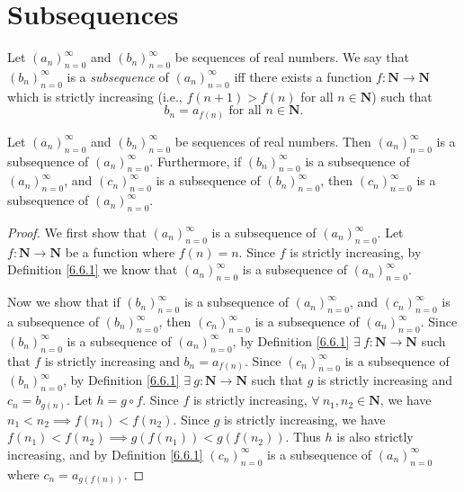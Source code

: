 \section{Subsequences}\label{sec 6.6}

\begin{definition}[Subsequences]\label{6.6.1}
    Let \((a_n)_{n = 0}^\infty\) and \((b_n)_{n = 0}^\infty\) be sequences of real numbers.
    We say that \((b_n)_{n = 0}^\infty\) is a \emph{subsequence} of \((a_n)_{n = 0}^\infty\) iff there exists a function \(f : \mathbf{N} \to \mathbf{N}\) which is strictly increasing (i.e., \(f(n + 1) > f(n)\) for all \(n \in \mathbf{N}\)) such that
    \[
        b_n = a_{f(n)} \text{ for all } n \in \mathbf{N}.
    \]
\end{definition}

\setcounter{theorem}{3}
\begin{lemma}\label{6.6.4}
    Let \((a_n)_{n = 0}^\infty\) and \((b_n)_{n = 0}^\infty\) be sequences of real numbers.
    Then \((a_n)_{n = 0}^\infty\) is a subsequence of \((a_n)_{n = 0}^\infty\).
    Furthermore, if \((b_n)_{n = 0}^\infty\) is a subsequence of \((a_n)_{n = 0}^\infty\), and \((c_n)_{n = 0}^\infty\) is a subsequence of \((b_n)_{n = 0}^\infty\), then \((c_n)_{n = 0}^\infty\) is a subsequence of \((a_n)_{n = 0}^\infty\).
\end{lemma}

\begin{proof}
    We first show that \((a_n)_{n = 0}^\infty\) is a subsequence of \((a_n)_{n = 0}^\infty\).
    Let \(f : \mathbf{N} \to \mathbf{N}\) be a function where \(f(n) = n\).
    Since \(f\) is strictly increasing, by Definition \ref{6.6.1} we know that \((a_n)_{n = 0}^\infty\) is a subsequence of \((a_n)_{n = 0}^\infty\).

    Now we show that if \((b_n)_{n = 0}^\infty\) is a subsequence of \((a_n)_{n = 0}^\infty\), and \((c_n)_{n = 0}^\infty\) is a subsequence of \((b_n)_{n = 0}^\infty\), then \((c_n)_{n = 0}^\infty\) is a subsequence of \((a_n)_{n = 0}^\infty\).
    Since \((b_n)_{n = 0}^\infty\) is a subsequence of \((a_n)_{n = 0}^\infty\), by Definition \ref{6.6.1} \(\exists\ f : \mathbf{N} \to \mathbf{N}\) such that \(f\) is strictly increasing and \(b_n = a_{f(n)}\).
    Since \((c_n)_{n = 0}^\infty\) is a subsequence of \((b_n)_{n = 0}^\infty\), by Definition \ref{6.6.1} \(\exists\ g : \mathbf{N} \to \mathbf{N}\) such that \(g\) is strictly increasing and \(c_n = b_{g(n)}\).
    Let \(h = g \circ f\).
    Since \(f\) is strictly increasing, \(\forall\ n_1, n_2 \in \mathbf{N}\), we have \(n_1 < n_2 \implies f(n_1) < f(n_2)\).
    Since \(g\) is strictly increasing, we have \(f(n_1) < f(n_2) \implies g(f(n_1)) < g(f(n_2))\).
    Thus \(h\) is also strictly increasing, and by Definition \ref{6.6.1} \((c_n)_{n = 0}^\infty\) is a subsequence of \((a_n)_{n = 0}^\infty\) where \(c_n = a_{g(f(n))}\).
\end{proof}

